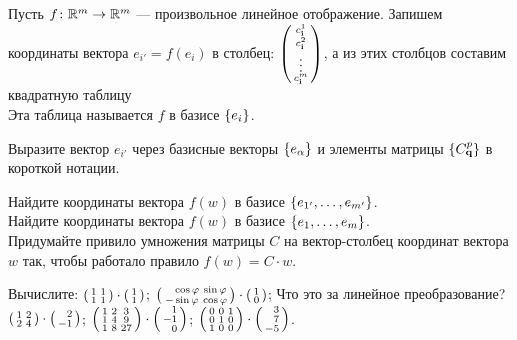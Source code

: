 \documentclass[a4paper,12pt]{article}
\newcommand{\smat}[1]{\hr{\begin{smallmatrix}#1\end{smallmatrix}}}
\begin{document}
    Пусть $f\colon\mathbb{R}^m\rightarrow\mathbb{R}^m$ --- произвольное линейное отображение.
    Запишем координаты вектора $e_{i'} = f(e_i)$ в столбец: $\left(\begin{smallmatrix}c^1_\textbf{i}\\c^2_\textbf{i}\\\vdots\\c^m_\textbf{i}\end{smallmatrix}\right)$, а из этих столбцов составим квадратную таблицу
    \\
    Эта таблица называется  $f$ в базисе $\left\{e_i\right\}$.


  Выразите вектор $e_{i'}$ через базисные векторы $\left\{e_{\alpha}\right\}$ и элементы матрицы $\left\{C^p_\textbf{q}\right\}$ в короткой нотации.



    Найдите координаты вектора $f(w)$ в базисе $\left\{e_{1'},\ldots, e_{m'}\right\}$.\\
    Найдите координаты вектора $f(w)$ в базисе $\left\{e_{1},\ldots, e_{m}\right\}$.\\
    Придумайте привило умножения матрицы $C$ на вектор-столбец координат вектора $w$ так,
    чтобы работало правило $f(w) = C\cdot w$.


    Вычислите:
    $\smat{1&1\\1&1}\cdot\smat{1\\1}$;
    $\smat{\phm\cos\ph&\sin\ph\\-\sin\ph&\cos\ph}\cdot\smat{1\\0}$;
    Что это за линейное преобразование?\\
    $\smat{1&2\\2&4}\cdot\smat{\phm2\\-1}$;
    $\smat{1&2&3\\1&4&9\\1&8&27}\cdot\smat{\phm1\\-1\\\phm0}$;
    $\smat{0&0&1\\0&1&0\\1&0&0}\cdot\smat{\phm3\\\phm7\\-5}$.
\end{document}
